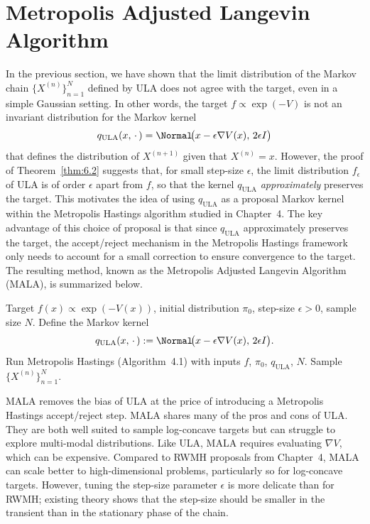 \section{Metropolis Adjusted Langevin Algorithm}
\label{sec:6.2}

In the previous section, we have shown that the limit distribution of the Markov chain
$\{X^{(n)}\}_{n=1}^N$ defined by ULA does not agree with the target, even in a simple
Gaussian setting. In other words, the target $f \propto \exp(-V)$ is not an invariant
distribution for the Markov kernel
\[
  q_{\mathrm{ULA}}(x,\,\cdot\,) = \Normal\!\bigl(x - \epsilon\nabla V(x),\, 2\epsilon I\bigr)
\]
that defines the distribution of $X^{(n+1)}$ given that $X^{(n)} = x$. However, the proof of
Theorem~\ref{thm:6.2} suggests that, for small step-size $\epsilon$, the limit distribution
$f_\epsilon$ of ULA is of order $\epsilon$ apart from $f$, so that the kernel $q_{\mathrm{ULA}}$
\emph{approximately} preserves the target. This motivates the idea of using $q_{\mathrm{ULA}}$
as a proposal Markov kernel within the Metropolis Hastings algorithm studied in Chapter~4. The
key advantage of this choice of proposal is that since $q_{\mathrm{ULA}}$ approximately
preserves the target, the accept/reject mechanism in the Metropolis Hastings framework only
needs to account for a small correction to ensure convergence to the target. The resulting
method, known as the Metropolis Adjusted Langevin Algorithm (MALA), is summarized below.

\begin{algorithm}[H]
  \caption{Metropolis Adjusted Langevin Algorithm (MALA)}
  \label{alg:6.2}
  \begin{algorithmic}[1]
    \Require Target $f(x) \propto \exp(-V(x))$, initial distribution $\pi_0$,
             step-size $\epsilon > 0$, sample size $N$.
    \State Define the Markov kernel
    \[
      q_{\mathrm{ULA}}(x,\,\cdot\,) := \Normal\!\bigl(x - \epsilon\nabla V(x),\, 2\epsilon I\bigr).
    \]
    \State Run Metropolis Hastings (Algorithm~4.1) with inputs $f$, $\pi_0$, $q_{\mathrm{ULA}}$, $N$.
    \Ensure Sample $\{X^{(n)}\}_{n=1}^N$.
  \end{algorithmic}
\end{algorithm}

\begin{remark}
MALA removes the bias of ULA at the price of introducing a Metropolis Hastings accept/reject
step. MALA shares many of the pros and cons of ULA. They are both well suited to sample
log-concave targets but can struggle to explore multi-modal distributions. Like ULA, MALA
requires evaluating $\nabla V$, which can be expensive. Compared to RWMH proposals from
Chapter~4, MALA can scale better to high-dimensional problems, particularly so for log-concave
targets. However, tuning the step-size parameter $\epsilon$ is more delicate than for RWMH;
existing theory shows that the step-size should be smaller in the transient than in the
stationary phase of the chain.
\end{remark}

